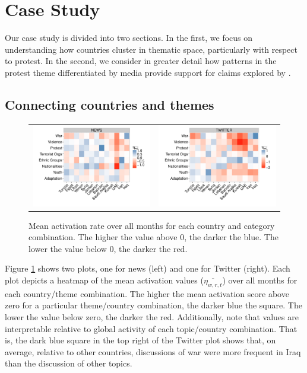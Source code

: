 
\section{Case Study}

Our case study is divided into two sections. In the first, we focus on understanding how countries cluster in thematic space, particularly with respect to protest. In the second, we consider in greater detail how patterns in the protest theme differentiated by media provide support for claims explored by \cite{cottle_media_2011}.

\subsection{Connecting countries and themes}

\begin{figure}[th]
	\centering
	\begin{tabular}{cc}
		\includegraphics[width=.5\textwidth]{imgs/activity_topics_news} &
		\includegraphics[width=.5\textwidth]{imgs/activity_topics_twitter} \\
	\end{tabular}
	\caption{Mean activation rate over all months for each country and category combination.  The higher the value above 0, the darker the blue. The lower the value below 0, the darker the red. }
	\label{fig:overall}
\end{figure}


Figure \ref{fig:overall} shows two plots, one for news (left) and one for Twitter (right). Each plot depicts a heatmap of the mean activation values ($\overline{\eta_{w,r,t}}$) over all months for each country/theme combination. The higher the mean activation score above zero for a particular theme/country combination, the darker blue the square. The lower the value below zero, the darker the red. Additionally, note that values are interpretable relative to global activity of each topic/country combination. That is, the dark blue square in the top right of the Twitter plot shows that, on average, relative to other countries, discussions of war were more frequent in Iraq than the discussion of other topics. 

